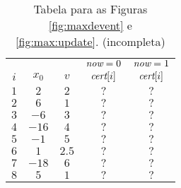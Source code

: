 \begin{table}
    \begin{tabular}{|c|c|c|c|c|}
        \hline
            & & & $\textit{now} = 0$ & $\textit{now} = 1$ \\
        $i$ & $x_0$ & $v$ & $\textit{cert}[i]$ & $\textit{cert}[i]$ \\
        \hline
        $1$ & $2$ & $2$ & $?$ & $?$ \\

        $2$ & $6$ & $1$ & $?$ & $?$ \\

        $3$ & $-6$ & $3$ & $?$ & $?$ \\

        $4$ & $-16$ & $4$ & $?$ & $?$ \\

        $5$ & $-1$ & $5$ & $?$ & $?$ \\

        $6$ & $1$ & $2.5$ & $?$ & $?$ \\

        $7$ & $-18$ & $6$ & $?$ & $?$ \\

        $8$ & $5$ & $1$ & $?$ & $?$ \\

        \hline
    \end{tabular}
    \caption{Tabela para as Figuras \ref{fig:maxdevent} e
    \ref{fig:max:update}. (incompleta)}
\end{table}
